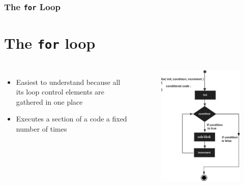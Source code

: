 \documentclass{beamer}
\begin{document}
\begin{frame}
    \frametitle{The \texttt{for} Loop}
    \section{The \texttt{for} loop} %
    \begin{columns}
        \begin{itemize}
            \item Easiest to understand because all its loop control elements are gathered in one place
            \item Executes a section of a code a fixed number of times
        \end{itemize}
        \begin{figure}
            \centering
            \includegraphics[scale=0.4]{for}
        \end{figure}
    \end{columns}
\end{frame}
\end{document}
